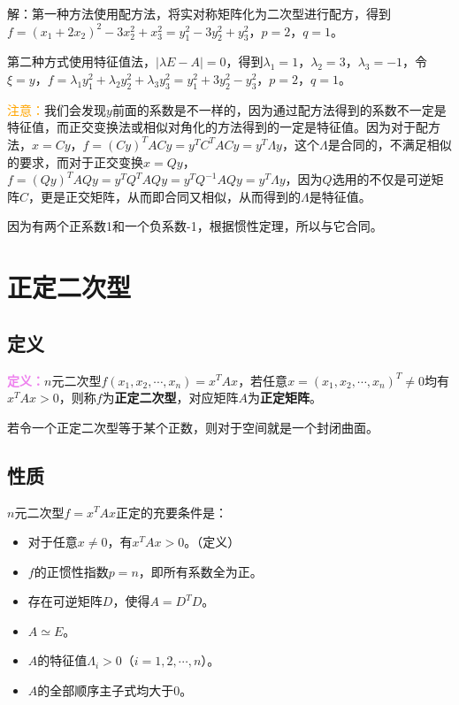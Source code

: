 解：第一种方法使用配方法，将实对称矩阵化为二次型进行配方，得到$f=(x_1+2x_2)^2-3x_2^2+x_3^2=y_1^2-3y_2^2+y_3^2$，$p=2$，$q=1$。

第二种方式使用特征值法，$\vert\lambda E-A\vert=0$，得到$\lambda_1=1$，$\lambda_2=3$，$\lambda_3=-1$，令$\xi=y$，$f=\lambda_1y_1^2+\lambda_2y_2^2+\lambda_3y_3^2=y_1^2+3y_2^2-y_3^2$，$p=2$，$q=1$。

\textcolor{orange}{注意：}我们会发现$y$前面的系数是不一样的，因为通过配方法得到的系数不一定是特征值，而正交变换法或相似对角化的方法得到的一定是特征值。因为对于配方法，$x=Cy$，$f=(Cy)^TACy=y^TC^TACy=y^T\Lambda y$，这个$\Lambda$是合同的，不满足相似的要求，而对于正交变换$x=Qy$，$f=(Qy)^TAQy=y^TQ^TAQy=y^TQ^{-1}AQy=y^T\Lambda y$，因为$Q$选用的不仅是可逆矩阵$C$，更是正交矩阵，从而即合同又相似，从而得到的$\Lambda$是特征值。

因为有两个正系数1和一个负系数-1，根据惯性定理，所以与它合同。

\section{正定二次型}

\subsection{定义}

\textcolor{violet}{\textbf{定义：}}$n$元二次型$f(x_1,x_2,\cdots,x_n)=x^TAx$，若任意$x=(x_1,x_2,\cdots,x_n)^T\neq0$均有$x^TAx>0$，则称$f$为\textbf{正定二次型}，对应矩阵$A$为\textbf{正定矩阵}。

若令一个正定二次型等于某个正数，则对于空间就是一个封闭曲面。

\subsection{性质}

$n$元二次型$f=x^TAx$正定的充要条件是：

\begin{itemize}
    \item 对于任意$x\neq0$，有$x^TAx>0$。（定义）
    \item $f$的正惯性指数$p=n$，即所有系数全为正。
    \item 存在可逆矩阵$D$，使得$A=D^TD$。
    \item $A\simeq E$。
    \item $A$的特征值$\Lambda_i>0$（$i=1,2,\cdots,n$）。
    \item $A$的全部顺序主子式均大于0。
\end{itemize}

